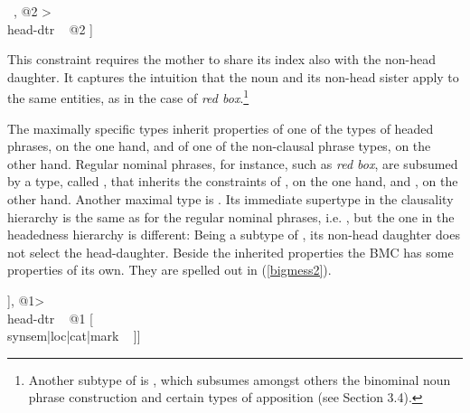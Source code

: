 \documentclass[output=paper]{langsci/langscibook}
\begin{document}
\begin{exe}
\ex\label{mononom} 
\begin{avm}
[\type{intersective-modification}                \\
 synsem|loc|content|index ~ @1 \type{index}      \\
 dtrs ~ <[synsem|loc|content|index ~ @1 ] ~, @2 > \\
 head-dtr ~ @2  ]
\end{avm}
\end{exe}

\noindent 
This constraint requires the mother to share its index also with the 
non-head daughter. It captures the intuition that the 
noun and its non-head sister apply to the same entities, as in 
the case of \emph{red box}.\footnote{Another subtype of  
is , which subsumes amongst others 
the binominal noun phrase construction and certain types of apposition
(see Section 3.4).}  

The maximally specific types inherit properties of one of the types of headed phrases,
on the one hand, and of one of the non-clausal phrase types, on the other hand.  
Regular nominal phrases, for instance, such as \emph{red box}, are subsumed 
by a type, called , that inherits the 
constraints of , on the one hand, and 
, on the other hand.  
Another maximal type is . 
Its immediate supertype in the {\sc clausality} hierarchy is the same 
as for the regular nominal phrases, i.e. , 
but the one in the {\sc headedness} hierarchy is different: 
Being a subtype of , 
its non-head daughter does not select the head-daughter. 
Beside the inherited properties the BMC has some properties of its own.   
They are spelled out in (\ref{bigmess2}).

\begin{exe}
\ex\label{bigmess2} 
\begin{avm}
[\type{big-mess-phr}                                    \\     
 dtrs ~ <[\type{hd-functor-phr}                         \\
          synsem|loc|cat [head ~ \type{adjective}       \\
                          mark ~ \type{marked} ]], @1> \\
 head-dtr ~ @1 [              \\
                synsem|loc|cat|mark ~ ]]
\end{avm}
\end{exe}
\end{document}
